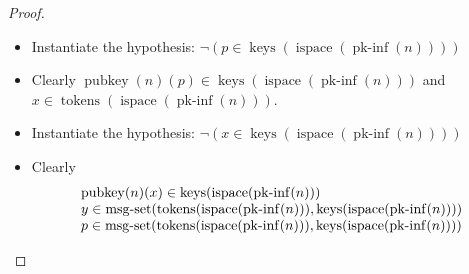 \documentclass[11pt]{article}
\theoremstyle{plain}
\begin{document}
\begin{proof}
\begin{itemize}[leftmargin=2.8em, itemsep=4pt, parsep=1pt]
\begin{equation*}
\begin{array}{@{}l@{}}
\neg (y \in \operatorname{names}(n)) \\
\neg (y \in \operatorname{keys}(\operatorname{ispace}(\operatorname{pk\text{-}inf}(n)))) \\
\begin{array}{@{}l@{}} \operatorname{strand\text{-}map}(\operatorname{ispace}(\operatorname{pk\text{-}inf}(n)))(s) \\ =\; \langle \langle \mathit{sent}, \operatorname{encr}(\operatorname{lst}(\langle y, p \rangle), \operatorname{pubkey}(n)(x)) \rangle, \langle \mathit{received}, \operatorname{encr}(\operatorname{lst}(\langle y, z, x \rangle), \operatorname{pubkey}(n)(p)) \rangle, \langle \mathit{sent}, \operatorname{encr}(z, \operatorname{pubkey}(n)(x)) \rangle \rangle \end{array} \\
\neg (z \in \operatorname{keys}(\operatorname{ispace}(\operatorname{pk\text{-}inf}(n))))
\end{array}
\end{equation*}
Clearly $p \in \operatorname{tokens}(\operatorname{ispace}(\operatorname{pk\text{-}inf}(n)))$.
  \item[\textbf{43}] Instantiate the hypothesis: $\neg (p \in \operatorname{keys}(\operatorname{ispace}(\operatorname{pk\text{-}inf}(n))))$
  \item[\textbf{44--45}] Clearly $\operatorname{pubkey}(n)(p) \in \operatorname{keys}(\operatorname{ispace}(\operatorname{pk\text{-}inf}(n)))$ and $x \in \operatorname{tokens}(\operatorname{ispace}(\operatorname{pk\text{-}inf}(n)))$.
  \item[\textbf{46}] Instantiate the hypothesis: $\neg (x \in \operatorname{keys}(\operatorname{ispace}(\operatorname{pk\text{-}inf}(n))))$
  \item[\textbf{47--49}] Clearly
\begin{equation*}
\begin{array}{@{}l@{}}
\operatorname{pubkey}(n)(x) \in \operatorname{keys}(\operatorname{ispace}(\operatorname{pk\text{-}inf}(n))) \\
y \in \operatorname{msg\text{-}set}(\operatorname{tokens}(\operatorname{ispace}(\operatorname{pk\text{-}inf}(n))), \operatorname{keys}(\operatorname{ispace}(\operatorname{pk\text{-}inf}(n)))) \\
p \in \operatorname{msg\text{-}set}(\operatorname{tokens}(\operatorname{ispace}(\operatorname{pk\text{-}inf}(n))), \operatorname{keys}(\operatorname{ispace}(\operatorname{pk\text{-}inf}(n))))
\end{array}
\end{equation*}


\end{itemize}
\end{proof}
\end{document}
